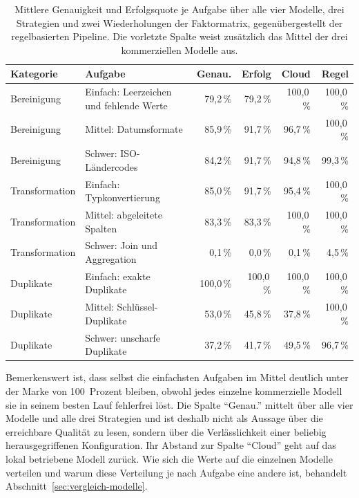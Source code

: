 \begin{table}[tb]
    \centering
    \small
    \caption[Ergebnisse je ETL-Aufgabe]{Mittlere Genauigkeit und Erfolgsquote je Aufgabe über alle vier Modelle, drei Strategien und zwei Wiederholungen der Faktormatrix, gegenübergestellt der regelbasierten Pipeline. Die vorletzte Spalte weist zusätzlich das Mittel der drei kommerziellen Modelle aus.}
    \label{tab:ergebnisse-aufgaben}
    \begin{tabularx}{\textwidth}{@{}lXrrrr@{}}
        \toprule
        \textbf{Kategorie} & \textbf{Aufgabe} & \textbf{Genau.} & \textbf{Erfolg} & \textbf{Cloud} & \textbf{Regel} \\
        \midrule
        Bereinigung & Einfach: Leerzeichen und fehlende Werte & 79,2\,\% & 79,2\,\% & 100,0\,\% & 100,0\,\% \\
        Bereinigung & Mittel: Datumsformate & 85,9\,\% & 91,7\,\% & 96,7\,\% & 100,0\,\% \\
        Bereinigung & Schwer: ISO-Ländercodes & 84,2\,\% & 91,7\,\% & 94,8\,\% & 99,3\,\% \\
        \addlinespace
        Transformation & Einfach: Typkonvertierung & 85,0\,\% & 91,7\,\% & 95,4\,\% & 100,0\,\% \\
        Transformation & Mittel: abgeleitete Spalten & 83,3\,\% & 83,3\,\% & 100,0\,\% & 100,0\,\% \\
        Transformation & Schwer: Join und Aggregation & 0,1\,\% & 0,0\,\% & 0,1\,\% & 4,5\,\% \\
        \addlinespace
        Duplikate & Einfach: exakte Duplikate & 100,0\,\% & 100,0\,\% & 100,0\,\% & 100,0\,\% \\
        Duplikate & Mittel: Schlüssel-Duplikate & 53,0\,\% & 45,8\,\% & 37,8\,\% & 100,0\,\% \\
        Duplikate & Schwer: unscharfe Duplikate & 37,2\,\% & 41,7\,\% & 49,5\,\% & 96,7\,\% \\
        \bottomrule
    \end{tabularx}
\end{table}

Bemerkenswert ist, dass selbst die einfachsten Aufgaben im Mittel deutlich unter der Marke von 100~Prozent bleiben, obwohl jedes einzelne kommerzielle Modell sie in seinem besten Lauf fehlerfrei löst. Die Spalte \enquote{Genau.} mittelt über alle vier Modelle und alle drei Strategien und ist deshalb nicht als Aussage über die erreichbare Qualität zu lesen, sondern über die Verlässlichkeit einer beliebig herausgegriffenen Konfiguration. Ihr Abstand zur Spalte \enquote{Cloud} geht auf das lokal betriebene Modell zurück. Wie sich die Werte auf die einzelnen Modelle verteilen und warum diese Verteilung je nach Aufgabe eine andere ist, behandelt Abschnitt~\ref{sec:vergleich-modelle}.

